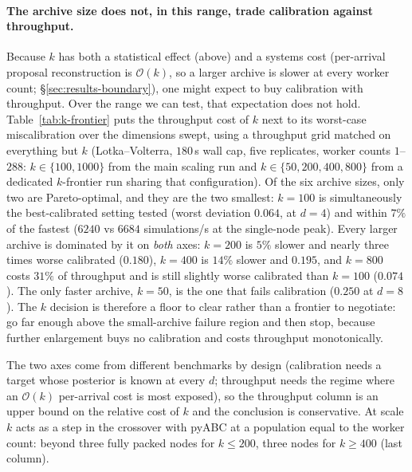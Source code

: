 \documentclass[10pt]{article}
\theoremstyle{plain}
\theoremstyle{definition}
\begin{document}
\paragraph{The archive size does not, in this range, trade calibration against throughput.} Because $k$ has both a statistical effect (above) and a systems cost (per-arrival proposal reconstruction is $\mathcal{O}(k)$, so a larger archive is slower at every worker count; \S\ref{sec:results-boundary}), one might expect to buy calibration with throughput. Over the range we can test, that expectation does not hold. Table~\ref{tab:k-frontier} puts the throughput cost of $k$ next to its worst-case miscalibration over the dimensions swept, using a throughput grid matched on everything but $k$ (Lotka--Volterra, $180$\,s wall cap, five replicates, worker counts $1$--$288$: $k\in\{100,1000\}$ from the main scaling run and $k\in\{50,200,400,800\}$ from a dedicated $k$-frontier run sharing that configuration). Of the six archive sizes, only two are Pareto-optimal, and they are the two smallest: $k=100$ is simultaneously the best-calibrated setting tested (worst deviation $0.064$, at $d=4$) and within $7\%$ of the fastest ($6240$ vs $6684$ simulations/s at the single-node peak). Every larger archive is dominated by it on \emph{both} axes: $k=200$ is $5\%$ slower and nearly three times worse calibrated ($0.180$), $k=400$ is $14\%$ slower and $0.195$, and $k=800$ costs $31\%$ of throughput and is still slightly worse calibrated than $k=100$ ($0.074$). The only faster archive, $k=50$, is the one that fails calibration ($0.250$ at $d=8$). The $k$ decision is therefore a floor to clear rather than a frontier to negotiate: go far enough above the small-archive failure region and then stop, because further enlargement buys no calibration and costs throughput monotonically.

The two axes come from different benchmarks by design (calibration needs a target whose posterior is known at every $d$; throughput needs the regime where an $\mathcal{O}(k)$ per-arrival cost is most exposed), so the throughput column is an upper bound on the relative cost of $k$ and the conclusion is conservative. At scale $k$ acts as a step in the crossover with pyABC at a population equal to the worker count: beyond three fully packed nodes for $k\le200$, three nodes for $k\ge400$ (last column).
\end{document}
